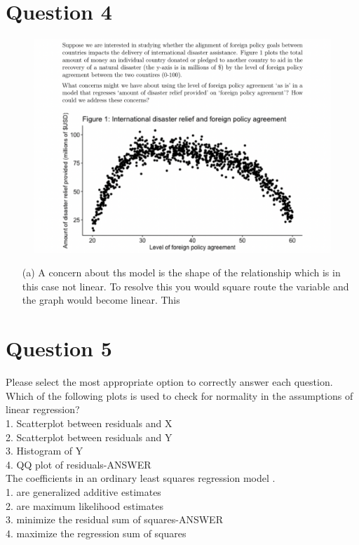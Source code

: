 \documentclass[12pt,letterpaper]{article}
\begin{document}
	
	\section*{Question 4}
	\vspace{.25cm}
\begin{figure}[H]
\centering
\includegraphics[width=0.7\linewidth]{Q4}
\caption{}
\label{fig:q4}
\end{figure}
	\begin{enumerate}
	\item [(a)] 
	A concern about ths model is the shape of the relationship which is in this case not linear. To resolve this you would square route the variable and the graph would become linear. This 
	
	\end{enumerate}  
		\section*{Question 5}
	\vspace{.25cm}
	\noindent Please select the most appropriate option to correctly answer each question.\\
	
	Which of the following plots is used to check for normality in the assumptions of linear
	regression?\\
	1. Scatterplot between residuals and X\\
	2. Scatterplot between residuals and Y\\
	3. Histogram of Y\\
	4. QQ plot of residuals-ANSWER\\
	
	The coefficients in an ordinary least squares regression model .\\
	1. are generalized additive estimates\\
	2. are maximum likelihood estimates\\
	3. minimize the residual sum of squares-ANSWER\\
	4. maximize the regression sum of squares\\
	
\end{document}
